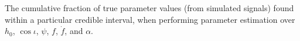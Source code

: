 \label{fig:pp_extra}
The cumulative fraction of true parameter values (from simulated signals) found within
a particular credible interval, when performing parameter estimation over $h_0$, $\cos{\iota}$,
$\psi$, $f$, $\dot{f}$, and $\alpha$. 
